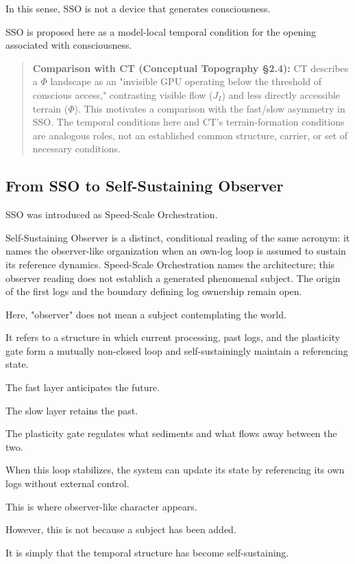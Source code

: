 In this sense, SSO is not a device that generates consciousness.

SSO is proposed here as a model-local temporal condition for the opening associated with consciousness.

\begin{quote}
\textbf{Comparison with CT (Conceptual Topography §2.4):} CT describes a $\Phi$ landscape as an "invisible GPU operating below the threshold of conscious access," contrasting visible flow ($J_I$) and less directly accessible terrain ($\Phi$). This motivates a comparison with the fast/slow asymmetry in SSO. The temporal conditions here and CT's terrain-formation conditions are analogous roles, not an established common structure, carrier, or set of necessary conditions.
\end{quote}

\subsection{From SSO to Self-Sustaining Observer}


SSO was introduced as Speed-Scale Orchestration.

Self-Sustaining Observer is a distinct, conditional reading of the same acronym: it names the observer-like organization when an own-log loop is assumed to sustain its reference dynamics. Speed-Scale Orchestration names the architecture; this observer reading does not establish a generated phenomenal subject. The origin of the first logs and the boundary defining log ownership remain open.

Here, "observer" does not mean a subject contemplating the world.

It refers to a structure in which current processing, past logs, and the plasticity gate form a mutually non-closed loop and self-sustainingly maintain a referencing state.

The fast layer anticipates the future.

The slow layer retains the past.

The plasticity gate regulates what sediments and what flows away between the two.

When this loop stabilizes, the system can update its state by referencing its own logs without external control.

This is where observer-like character appears.

However, this is not because a subject has been added.

It is simply that the temporal structure has become self-sustaining.

